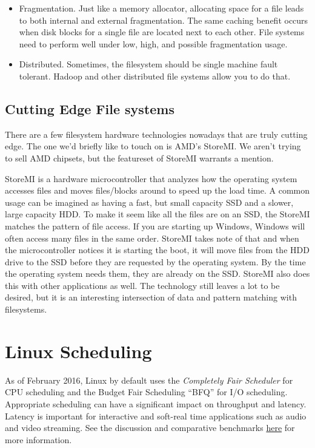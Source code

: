 \begin{itemize}
\item Fragmentation. Just like a memory allocator, allocating space for a file leads to both internal and external fragmentation. The same caching benefit occurs when disk blocks for a single file are located next to each other. File systems need to perform well under low, high, and possible fragmentation usage.
\item Distributed. Sometimes, the filesystem should be single machine fault tolerant. Hadoop and other distributed file systems allow you to do that.
\end{itemize}

\subsection{Cutting Edge File systems}

There are a few filesystem hardware technologies nowadays that are truly cutting edge.
The one we'd briefly like to touch on is AMD's StoreMI.
We aren't trying to sell AMD chipsets, but the featureset of StoreMI warrants a mention.

StoreMI is a hardware microcontroller that analyzes how the operating system accesses files and moves files/blocks around to speed up the load time.
A common usage can be imagined as having a fast, but small capacity SSD and a slower, large capacity HDD.
To make it seem like all the files are on an SSD, the StoreMI matches the pattern of file access.
If you are starting up Windows, Windows will often access many files in the same order.
StoreMI takes note of that and when the microcontroller notices it is starting the boot, it will move files from the HDD drive to the SSD before they are requested by the operating system.
By the time the operating system needs them, they are already on the SSD.
StoreMI also does this with other applications as well.
The technology still leaves a lot to be desired, but it is an interesting intersection of data and pattern matching with filesystems.


\section{Linux Scheduling}

As of February 2016, Linux by default uses the \emph{Completely Fair Scheduler} for CPU scheduling and the Budget Fair Scheduling ``BFQ'' for I/O scheduling. Appropriate scheduling can have a significant impact on throughput and latency. Latency is important for interactive and soft-real time applications such as audio and video streaming. See the discussion and comparative benchmarks \href{https://lkml.org/lkml/2014/5/27/314}{here} for more information.


